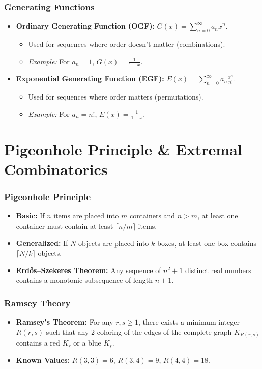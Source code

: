 \documentclass[11pt]{article}
\begin{document}
\section{Generating Functions}
\begin{itemize}
    \item \textbf{Ordinary Generating Function (OGF):} \(G(x) = \sum_{n=0}^\infty a_n x^n\).
    \begin{itemize}
        \item Used for sequences where order doesn't matter (combinations).
        \item \emph{Example:} For \(a_n = 1\), \(G(x) = \frac{1}{1-x}\).
    \end{itemize}
    \item \textbf{Exponential Generating Function (EGF):} \(E(x) = \sum_{n=0}^\infty a_n \frac{x^n}{n!}\).
    \begin{itemize}
        \item Used for sequences where order matters (permutations).
        \item \emph{Example:} For \(a_n = n!\), \(E(x) = \frac{1}{1-x}\).
    \end{itemize}
\end{itemize}

\hrulefill

\part{Pigeonhole Principle \& Extremal Combinatorics}

\section{Pigeonhole Principle}
\begin{itemize}
    \item \textbf{Basic:} If \(n\) items are placed into \(m\) containers and \(n > m\), at least one container must contain at least \(\lceil n/m \rceil\) items.
    \item \textbf{Generalized:} If \(N\) objects are placed into \(k\) boxes, at least one box contains \(\lceil N/k \rceil\) objects.
    \item \textbf{Erdős–Szekeres Theorem:} Any sequence of \(n^2 + 1\) distinct real numbers contains a monotonic subsequence of length \(n+1\).
\end{itemize}

\section{Ramsey Theory}
\begin{itemize}
    \item \textbf{Ramsey's Theorem:} For any \(r, s \ge 1\), there exists a minimum integer \(R(r,s)\) such that any 2-coloring of the edges of the complete graph \(K_{R(r,s)}\) contains a red \(K_r\) or a blue \(K_s\).
    \item \textbf{Known Values:} \(R(3,3) = 6\), \(R(3,4) = 9\), \(R(4,4) = 18\).
\end{itemize}
\end{document}
